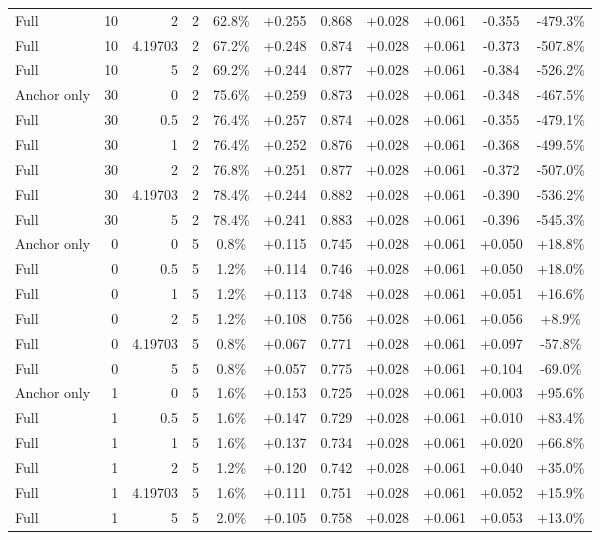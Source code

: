 \begin{table}[htbp]
\begin{tabular}{lrrrccccccc}
Full & 10 & 2 & 2 & 62.8\% & +0.255 & 0.868 & +0.028 & +0.061 & -0.355 & -479.3\% \\
Full & 10 & 4.19703 & 2 & 67.2\% & +0.248 & 0.874 & +0.028 & +0.061 & -0.373 & -507.8\% \\
Full & 10 & 5 & 2 & 69.2\% & +0.244 & 0.877 & +0.028 & +0.061 & -0.384 & -526.2\% \\
Anchor only & 30 & 0 & 2 & 75.6\% & +0.259 & 0.873 & +0.028 & +0.061 & -0.348 & -467.5\% \\
Full & 30 & 0.5 & 2 & 76.4\% & +0.257 & 0.874 & +0.028 & +0.061 & -0.355 & -479.1\% \\
Full & 30 & 1 & 2 & 76.4\% & +0.252 & 0.876 & +0.028 & +0.061 & -0.368 & -499.5\% \\
Full & 30 & 2 & 2 & 76.8\% & +0.251 & 0.877 & +0.028 & +0.061 & -0.372 & -507.0\% \\
Full & 30 & 4.19703 & 2 & 78.4\% & +0.244 & 0.882 & +0.028 & +0.061 & -0.390 & -536.2\% \\
Full & 30 & 5 & 2 & 78.4\% & +0.241 & 0.883 & +0.028 & +0.061 & -0.396 & -545.3\% \\
Anchor only & 0 & 0 & 5 & 0.8\% & +0.115 & 0.745 & +0.028 & +0.061 & +0.050 & +18.8\% \\
Full & 0 & 0.5 & 5 & 1.2\% & +0.114 & 0.746 & +0.028 & +0.061 & +0.050 & +18.0\% \\
Full & 0 & 1 & 5 & 1.2\% & +0.113 & 0.748 & +0.028 & +0.061 & +0.051 & +16.6\% \\
Full & 0 & 2 & 5 & 1.2\% & +0.108 & 0.756 & +0.028 & +0.061 & +0.056 & +8.9\% \\
Full & 0 & 4.19703 & 5 & 0.8\% & +0.067 & 0.771 & +0.028 & +0.061 & +0.097 & -57.8\% \\
Full & 0 & 5 & 5 & 0.8\% & +0.057 & 0.775 & +0.028 & +0.061 & +0.104 & -69.0\% \\
Anchor only & 1 & 0 & 5 & 1.6\% & +0.153 & 0.725 & +0.028 & +0.061 & +0.003 & +95.6\% \\
Full & 1 & 0.5 & 5 & 1.6\% & +0.147 & 0.729 & +0.028 & +0.061 & +0.010 & +83.4\% \\
Full & 1 & 1 & 5 & 1.6\% & +0.137 & 0.734 & +0.028 & +0.061 & +0.020 & +66.8\% \\
Full & 1 & 2 & 5 & 1.2\% & +0.120 & 0.742 & +0.028 & +0.061 & +0.040 & +35.0\% \\
Full & 1 & 4.19703 & 5 & 1.6\% & +0.111 & 0.751 & +0.028 & +0.061 & +0.052 & +15.9\% \\
Full & 1 & 5 & 5 & 2.0\% & +0.105 & 0.758 & +0.028 & +0.061 & +0.053 & +13.0\% \\

\end{tabular}
\end{table}
